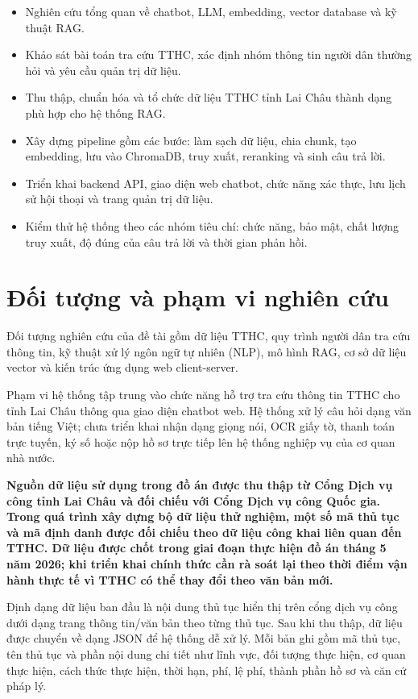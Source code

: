 \begin{itemize}
\item
  Nghiên cứu tổng quan về chatbot, LLM, embedding, vector database và kỹ
  thuật RAG.
\item
  Khảo sát bài toán tra cứu TTHC, xác định nhóm thông tin người dân
  thường hỏi và yêu cầu quản trị dữ liệu.
\item
  Thu thập, chuẩn hóa và tổ chức dữ liệu TTHC tỉnh Lai Châu thành dạng
  phù hợp cho hệ thống RAG.
\item
  Xây dựng pipeline gồm các bước: làm sạch dữ liệu, chia chunk, tạo
  embedding, lưu vào ChromaDB, truy xuất, reranking và sinh câu trả lời.
\item
  Triển khai backend API, giao diện web chatbot, chức năng xác thực, lưu
  lịch sử hội thoại và trang quản trị dữ liệu.
\item
  Kiểm thử hệ thống theo các nhóm tiêu chí: chức năng, bảo mật, chất
  lượng truy xuất, độ đúng của câu trả lời và thời gian phản hồi.
\end{itemize}

\section*{Đối tượng và phạm vi nghiên
cứu}

Đối tượng nghiên cứu của đề tài gồm dữ liệu TTHC, quy trình người dân
tra cứu thông tin, kỹ thuật xử lý ngôn ngữ tự nhiên (NLP), mô hình RAG,
cơ sở dữ liệu vector và kiến trúc ứng dụng web client-server.

Phạm vi hệ thống tập trung vào chức năng hỗ trợ tra cứu thông tin TTHC
cho tỉnh Lai Châu thông qua giao diện chatbot web. Hệ thống xử lý câu
hỏi dạng văn bản tiếng Việt; chưa triển khai nhận dạng giọng nói, OCR
giấy tờ, thanh toán trực tuyến, ký số hoặc nộp hồ sơ trực tiếp lên hệ
thống nghiệp vụ của cơ quan nhà nước.

\textbf{Nguồn dữ liệu sử dụng trong đồ án được thu thập từ Cổng Dịch vụ
công tỉnh Lai Châu và đối chiếu với Cổng Dịch vụ công Quốc gia. Trong
quá trình xây dựng bộ dữ liệu thử nghiệm, một số mã thủ tục và mã định
danh được đối chiếu theo dữ liệu công khai liên quan đến TTHC. Dữ liệu
được chốt trong giai đoạn thực hiện đồ án tháng 5 năm 2026; khi triển
khai chính thức cần rà soát lại theo thời điểm vận hành thực tế vì TTHC
có thể thay đổi theo văn bản mới.}

Định dạng dữ liệu ban đầu là nội dung thủ tục hiển thị trên cổng dịch vụ
công dưới dạng trang thông tin/văn bản theo từng thủ tục. Sau khi thu
thập, dữ liệu được chuyển về dạng JSON để hệ thống dễ xử lý. Mỗi bản ghi
gồm mã thủ tục, tên thủ tục và phần nội dung chi tiết như lĩnh vực, đối
tượng thực hiện, cơ quan thực hiện, cách thức thực hiện, thời hạn, phí,
lệ phí, thành phần hồ sơ và căn cứ pháp lý.

